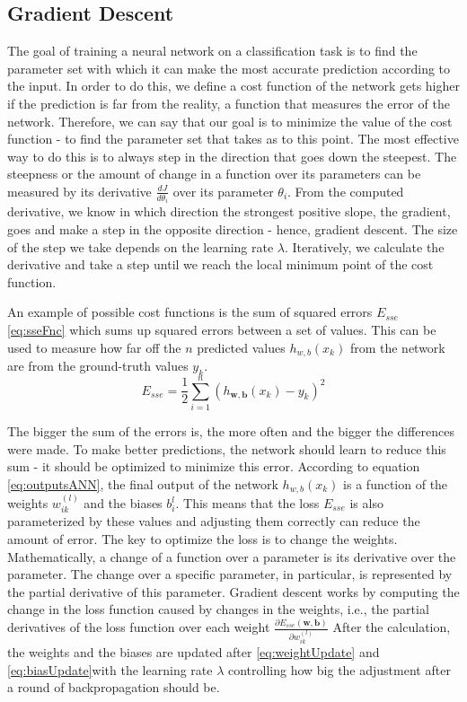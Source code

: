 \subsection*{Gradient Descent} \label{GD} 
The goal of training a neural network on a classification task is to find the parameter set with which it can make the most accurate prediction according to the input. In order to do this, we define a cost function of the network gets higher if the prediction is far from the reality, a function that measures the error of the network. Therefore, we can say that our goal is to minimize the value of the cost function - to find the parameter set that takes as to this point. The most effective way to do this is to always step in the direction that goes down the steepest. The steepness or the amount of change in a function over its parameters can be measured by its derivative $\frac{dJ}{d\theta_i}$ over its parameter $\theta_i$.  From the computed derivative, we know in which direction the strongest positive slope, the gradient, goes and make a step in the opposite direction - hence, gradient descent. The size of the step we take depends on the learning rate $\lambda$. Iteratively, we calculate the derivative and take a step until we reach the local minimum point of the cost function. 

An example of possible cost functions is the sum of squared errors $E_{sse}$ \eqref{eq:sseFnc} which sums up squared errors between a set of values. This can be used to measure how far off the $n$ predicted values $h_{w, b}(x_k)$ from the network are from the ground-truth values $y_k$.
	\begin{equation} \label{eq:sseFnc} 
		E_{sse} = \frac{1}{2}\overset{n}{\underset{i = 1}{\sum}}(h_{\bm{w},\bm{b}}(x_k) - y_k)^2
	\end{equation} 


The bigger the sum of the errors is, the more often and the bigger the differences were made. To make better predictions, the network should learn to reduce this sum - it should be optimized to minimize this error. According to equation \ref{eq:outputsANN}, the final output of the network $h_{w, b}(x_k)$ is a function of the weights $w_{ik}^{(l)}$ and the biases $b_i^l$. This means that the loss $E_{sse}$ is also parameterized by these values and adjusting them correctly can reduce the amount of error. The key to optimize the loss is to change the weights. Mathematically, a change of a function over a parameter is its derivative over the parameter. The change over a specific parameter, in particular, is represented by the partial derivative of this parameter. Gradient descent works by computing the change in the loss function caused by changes in the weights, i.e., the partial derivatives of the loss function over each weight $ \frac{\partial E_{sse}(\bm{w}, \bm{b})}{\partial w_{ik}^(l)}$ After the calculation, the weights and the biases are updated after \eqref{eq:weightUpdate} and \eqref{eq:biasUpdate}with the learning rate $\lambda$ controlling how big the adjustment after a round of backpropagation should be.

